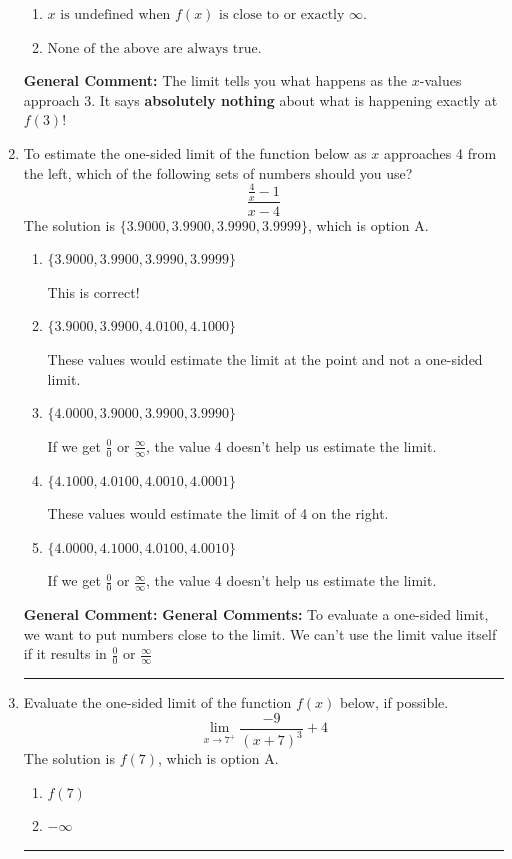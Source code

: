 \documentclass{extbook}[14pt]
\newcommand{\litem}[1]{\item #1

\rule{\textwidth}{0.4pt}}
\begin{document}
\begin{enumerate}
{\begin{enumerate}[label=\Alph*.]
\item \( x \text{ is undefined when } f(x) \text{ is close to or exactly } \infty. \)


\item \( \text{None of the above are always true.} \)


\end{enumerate}

\textbf{General Comment:} The limit tells you what happens as the $x$-values approach $3$. It says \textbf{absolutely nothing} about what is happening exactly at $f(3)$!
}
\litem{
To estimate the one-sided limit of the function below as $x$ approaches 4 from the left, which of the following sets of numbers should you use?
\[ \frac{\frac{4}{x} - 1}{x - 4} \]The solution is \( \{ 3.9000, 3.9900, 3.9990, 3.9999 \} \), which is option A.\begin{enumerate}[label=\Alph*.]
\item \( \{ 3.9000, 3.9900, 3.9990, 3.9999 \} \)

This is correct!
\item \( \{ 3.9000, 3.9900, 4.0100, 4.1000 \} \)

These values would estimate the limit at the point and not a one-sided limit.
\item \( \{ 4.0000, 3.9000, 3.9900, 3.9990 \} \)

If we get $\frac{0}{0}$ or $\frac{\infty}{\infty}$, the value 4 doesn't help us estimate the limit.
\item \( \{ 4.1000, 4.0100, 4.0010, 4.0001 \} \)

These values would estimate the limit of 4 on the right.
\item \( \{ 4.0000, 4.1000, 4.0100, 4.0010 \} \)

If we get $\frac{0}{0}$ or $\frac{\infty}{\infty}$, the value 4 doesn't help us estimate the limit.
\end{enumerate}

\textbf{General Comment:} \textbf{General Comments:} To evaluate a one-sided limit, we want to put numbers close to the limit. We can't use the limit value itself if it results in $\frac{0}{0}$ or $\frac{\infty}{\infty}$
}
\litem{
Evaluate the one-sided limit of the function $f(x)$ below, if possible.
\[ \lim_{x \rightarrow 7^+} \frac{-9}{(x+7)^3}+4 \]The solution is \( f(7) \), which is option A.\begin{enumerate}[label=\Alph*.]
\item \( f(7) \)


\item \( -\infty \)



\end{enumerate}}
\end{enumerate}
\end{document}
